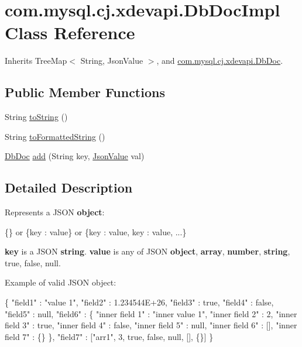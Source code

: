 \hypertarget{classcom_1_1mysql_1_1cj_1_1xdevapi_1_1_db_doc_impl}{}\section{com.\+mysql.\+cj.\+xdevapi.\+Db\+Doc\+Impl Class Reference}
\label{classcom_1_1mysql_1_1cj_1_1xdevapi_1_1_db_doc_impl}


Inherits Tree\+Map$<$ String, Json\+Value $>$, and \mbox{\hyperlink{interfacecom_1_1mysql_1_1cj_1_1xdevapi_1_1_db_doc}{com.\+mysql.\+cj.\+xdevapi.\+Db\+Doc}}.

\subsection*{Public Member Functions}
\begin{DoxyCompactItemize}
\item 
String \mbox{\hyperlink{classcom_1_1mysql_1_1cj_1_1xdevapi_1_1_db_doc_impl_abcc9b6b3b3d9cbd802d4a4e141e26c22}{to\+String}} ()
\item 
String \mbox{\hyperlink{classcom_1_1mysql_1_1cj_1_1xdevapi_1_1_db_doc_impl_a4880b999d135b6a871d605b523fc1529}{to\+Formatted\+String}} ()
\item 
\mbox{\hyperlink{interfacecom_1_1mysql_1_1cj_1_1xdevapi_1_1_db_doc}{Db\+Doc}} \mbox{\hyperlink{classcom_1_1mysql_1_1cj_1_1xdevapi_1_1_db_doc_impl_afc266a49bb4249ce1a52ce6e69c7daea}{add}} (String key, \mbox{\hyperlink{interfacecom_1_1mysql_1_1cj_1_1xdevapi_1_1_json_value}{Json\+Value}} val)
\end{DoxyCompactItemize}


\subsection{Detailed Description}
Represents a J\+S\+ON {\bfseries object}\+:


\begin{DoxyPre}
  \{\}
  or
  \{key : value\}
  or
  \{key : value, key : value, ...\}
\end{DoxyPre}


{\bfseries key} is a J\+S\+ON {\bfseries string}. {\bfseries value} is any of J\+S\+ON {\bfseries object}, {\bfseries array}, {\bfseries number}, {\bfseries string}, true, false, null.

Example of valid J\+S\+ON object\+:


\begin{DoxyPre}
\{
"field1" : "value 1",
"field2" : 1.234544E+26,
"field3" : true,
"field4" : false,
"field5" : null,
"field6" : \{
           "inner field 1" : "inner value 1",
           "inner field 2" : 2,
           "inner field 3" : true,
           "inner field 4" : false,
           "inner field 5" : null,
           "inner field 6" : [],
           "inner field 7" : \{\}
           \},
"field7" : ["arr1", 3, true, false, null, [], \{\}]
\}
\end{DoxyPre}


